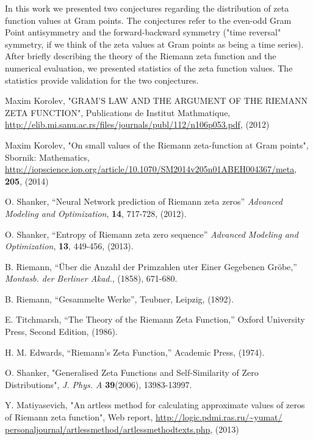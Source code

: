 \documentclass[twoside]{article}
\begin{document}
In this work we presented two conjectures regarding the distribution of zeta function values at Gram points. The conjectures refer to the even-odd Gram Point antisymmetry and the forward-backward symmetry ("time reversal" symmetry, if we think of the zeta values at Gram points as being a time series). After briefly describing the theory of the Riemann zeta function and the numerical evaluation, we presented statistics of the zeta function values. The statistics provide validation for the two conjectures.

 
\begin{thebibliography}{10} 

 Maxim Korolev,
"GRAM'S LAW AND THE ARGUMENT
OF THE RIEMANN ZETA FUNCTION", Publications de Institut Mathmatique,
\url{http://elib.mi.sanu.ac.rs/files/journals/publ/112/n106p053.pdf}, (2012)

 Maxim Korolev,
"On small values of the Riemann zeta-function at Gram points", Sbornik: Mathematics,
\url{http://iopscience.iop.org/article/10.1070/SM2014v205n01ABEH004367/meta},
{\bf205}, (2014)

 O. Shanker, ``Neural Network prediction of Riemann zeta zeros''
{\it Advanced Modeling and Optimization}, {\bf 14}, 717-728, (2012). 

 O. Shanker, ``Entropy of Riemann zeta zero sequence''
{\it Advanced Modeling and Optimization}, {\bf 13}, 449-456, (2013). 

 B. Riemann, ``\"{U}ber die Anzahl der Primzahlen uter
Einer Gegebenen Gr\"{o}be,'' {\it Montasb. der Berliner Akad.}, (1858),
671-680.

 B. Riemann, ``Gesammelte Werke'', Teubner, Leipzig, (1892).

 E. Titchmarsh, ``The Theory of the Riemann Zeta
Function,'' Oxford University Press, Second Edition, (1986).

 H. M. Edwards, ``Riemann's Zeta Function,'' 
Academic Press,  (1974).

 O. Shanker, 
"Generalised Zeta Functions and Self-Similarity of Zero Distributions",
{\it J.  Phys. A} {\bf39}(2006), 13983-13997.

 Y. Matiyasevich, 
"An artless method for calculating approximate values of
zeros of Riemann zeta function",
Web report, \url{http://logic.pdmi.ras.ru/~yumat/
personaljournal/artlessmethod/artlessmethodtexts.php}, (2013)


\end{thebibliography}
\end{document}

